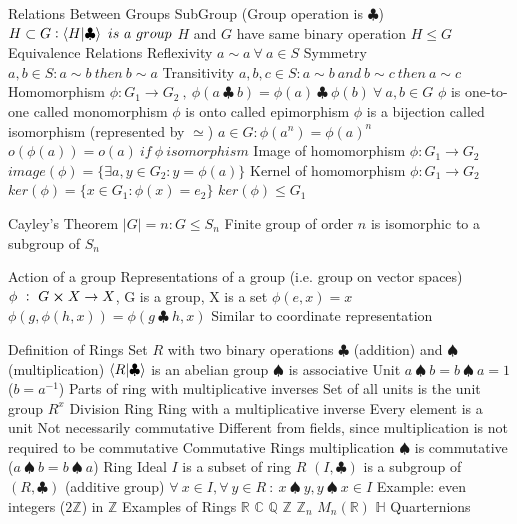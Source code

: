 \documentclass[14pt]{extarticle}
\begin{document}
\begin{outline}
	\1	Relations Between Groups
		\2	SubGroup (Group operation is $\clubsuit$)
			\3	$H \subset G : \braket{H}{\clubsuit}~is~a~group$
			\3	$H$ and $G$ have same binary operation
			\3	$H \le G$
		\2	Equivalence Relations
			\3	Reflexivity
				\4	$a \sim a~\forall~a \in S$ 
			\3	Symmetry
				\4	$a,b \in S : a \sim b~then~b \sim a$
			\3	Transitivity
				\4	$a,b,c \in S : a \sim b~and~b \sim c~then~a \sim c$
		\2	Homomorphism
			\3	$\phi : G_1 \rightarrow G_2~,~\phi(a~\clubsuit~b) = \phi(a)~\clubsuit~\phi(b)~\forall~a,b \in G$
			\3	$\phi$ is one-to-one called monomorphism
			\3	$\phi$ is onto called epimorphism
			\3	$\phi$ is a bijection called isomorphism (represented by $\simeq$)
			\3	$a \in G : \phi(a^n) = \phi(a)^n$
			\3	$o(\phi(a)) = o(a)~if~\phi~isomorphism$
			\3	Image of homomorphism
				\4	$\phi : G_1 \rightarrow G_2$
				\4	$image(\phi) = \{\exists a , y \in G_2 : y = \phi(a)\}$
			\3	Kernel of homomorphism
				\4	$\phi : G_1 \rightarrow G_2$
				\4	$ker(\phi) = \{x \in G_1 : \phi(x) = e_2\}$
				\4	$ker(\phi) \leq G_1$

		\2	Cayley's Theorem
			\3	$|G| = n : G \leq S_n$
			\3	Finite group of order $n$ is isomorphic to a subgroup of $S_n$
		
		\2	Action of a group
			\3	Representations of a group (i.e. group on vector spaces)
			\3	$\phi~:~G \cross X \rightarrow X$, G is a group, X is a set
				\4	$\phi(e,x) = x$
				\4	$\phi(g,\phi(h,x)) = \phi(g~\clubsuit~ h,x)$
			\3	Similar to coordinate representation

	\1	Definition of Rings
		\2	Set $R$ with two binary operations $\clubsuit$ (addition) and $\spadesuit$ (multiplication)
		\2	$\braket{R}{\clubsuit}$ is an abelian group
		\2	$\spadesuit$ is associative
		\2	Unit 
			\3	$a~\spadesuit~b = b~\spadesuit~a = 1$ ($b = a^{-1}$)
			\3	Parts of ring with multiplicative inverses
			\3	Set of all units is the unit group $R^x$
		\2	Division Ring
			\3	Ring with a multiplicative inverse
			\3	Every element is a unit
			\3	Not necessarily commutative
			\3	Different from fields, since multiplication is not required to be commutative
		\2	Commutative Rings
			\3	multiplication $\spadesuit$ is commutative ($a~\spadesuit~b = b~\spadesuit~a$)	
		\2	Ring Ideal
			\3	$I$ is a subset of ring $R$
			\3	$(I,\clubsuit)$ is a subgroup of $(R,\clubsuit)$ (additive group)
			\3	$\forall~x\in I,\forall~y\in R~:~x~\spadesuit~y,y~\spadesuit~x\in I$
			\3	Example:  even integers ($2\mathbb{Z}$) in $\mathbb{Z}$
	\1	Examples of Rings
		\2	$\mathbb{R}$ 
		\2	$\mathbb{C}$ 
		\2	$\mathbb{Q}$ 
		\2	$\mathbb{Z}$
		\2	$\mathbb{Z}_n$ 
		\2	$M_n(\mathbb{R})$
		\2	$\mathbb{H}$ Quarternions	
	

\end{outline}
\end{document}
